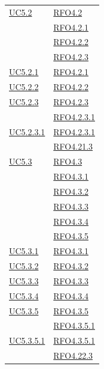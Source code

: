 \begin{longtable}{|>{\centering}m{5cm}|m{5cm}<{\centering}|}
\hyperref[UC5.2]{UC5.2} & \hyperlink{RFO4.2}{RFO4.2}\\
& \hyperlink{RFO4.2.1}{RFO4.2.1}\\
& \hyperlink{RFO4.2.2}{RFO4.2.2}\\
& \hyperlink{RFO4.2.3}{RFO4.2.3}\\ \hline

\hyperref[UC5.2.1]{UC5.2.1} & \hyperlink{RFO4.2.1}{RFO4.2.1}\\ \hline
\hyperref[UC5.2.2]{UC5.2.2} & \hyperlink{RFO4.2.2}{RFO4.2.2}\\ \hline
\hyperref[UC5.2.3]{UC5.2.3} & \hyperlink{RFO4.2.3}{RFO4.2.3}\\
& \hyperlink{RFO4.2.3.1}{RFO4.2.3.1}\\ \hline
\hyperref[UC5.2.3.1]{UC5.2.3.1} & \hyperlink{RFO4.2.3.1}{RFO4.2.3.1}\\ & \hyperlink{RFO4.21.3}{RFO4.21.3}\\ \hline

\hyperref[UC5.3]{UC5.3} & \hyperlink{RFO4.3}{RFO4.3}\\
& \hyperlink{RFO4.3.1}{RFO4.3.1}\\
& \hyperlink{RFO4.3.2}{RFO4.3.2}\\
& \hyperlink{RFO4.3.3}{RFO4.3.3}\\
& \hyperlink{RFO4.3.4}{RFO4.3.4}\\
& \hyperlink{RFO4.3.5}{RFO4.3.5}\\ \hline
\hyperref[UC5.3.1]{UC5.3.1} & \hyperlink{RFO4.3.1}{RFO4.3.1}\\ \hline
\hyperref[UC5.3.2]{UC5.3.2} & \hyperlink{RFO4.3.2}{RFO4.3.2}\\ \hline
\hyperref[UC5.3.3]{UC5.3.3} & \hyperlink{RFO4.3.3}{RFO4.3.3}\\ \hline
\hyperref[UC5.3.4]{UC5.3.4} & \hyperlink{RFO4.3.4}{RFO4.3.4}\\ \hline
\hyperref[UC5.3.5]{UC5.3.5} & \hyperlink{RFO4.3.5}{RFO4.3.5}\\
& \hyperlink{RFO4.3.5.1}{RFO4.3.5.1}\\ \hline
\hyperref[UC5.3.5.1]{UC5.3.5.1} & \hyperlink{RFO4.3.5.1}{RFO4.3.5.1}\\ & \hyperlink{RFO4.22.3}{RFO4.22.3}\\ \hline


\end{longtable}
